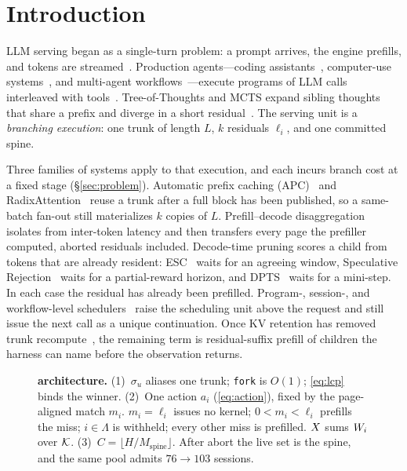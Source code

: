 \section{Introduction}
\label{sec:intro}

LLM serving began as a single-turn problem: a prompt arrives, the engine prefills, and tokens are streamed~\cite{orca,vllm,sglang}.
Production agents---coding assistants~\cite{sweagent,openhands}, computer-use systems~\cite{webarena}, and multi-agent workflows~\cite{autogen,metagpt}---execute programs of LLM calls interleaved with tools~\cite{react,compoundai}.
Tree-of-Thoughts and MCTS expand sibling thoughts that share a prefix and diverge in a short residual~\cite{tot,hive}.
The serving unit is a \emph{branching execution}: one trunk of length $L$, $k$ residuals $\ell_i$, and one committed spine.

Three families of systems apply to that execution, and each incurs branch cost at a fixed stage (\S\ref{sec:problem}).
Automatic prefix caching (APC)~\cite{vllm} and RadixAttention~\cite{sglang} reuse a trunk after a full block has been published, so a same-batch fan-out still materializes $k$ copies of $L$.
Prefill--decode disaggregation~\cite{distserve,splitwise} isolates \ttft{} from inter-token latency and then transfers every page the prefiller computed, aborted residuals included.
Decode-time pruning scores a child from tokens that are already resident: ESC~\cite{esc} waits for an agreeing window, Speculative Rejection~\cite{specrej} waits for a partial-reward horizon, and DPTS~\cite{dpts} waits for a mini-step.
In each case the residual has already been prefilled.
Program-, session-, and workflow-level schedulers~\cite{autellix,thunderagent,continuum,mori,ayo,parrot,pythia} raise the scheduling unit above the request and still issue the next call as a unique continuation.
Once KV retention has removed trunk recompute~\cite{continuum,mori}, the remaining \ttft{} term is residual-suffix prefill of children the harness can name before the observation returns.

\begin{figure}[t]
\centering
\resizebox{\textwidth}{!}{}
\caption{\textbf{\sys{} architecture.}
(1)~$\sigma_u$ aliases one trunk; \texttt{fork} is $O(1)$; \eqref{eq:lcp} binds the winner.
(2)~One action $a_i$ (\eqref{eq:action}), fixed by the page-aligned match $m_i$.
$m_i=\ell_i$ issues no kernel; $0{<}m_i{<}\ell_i$ prefills the miss; $i{\in}\Lambda$ is withheld; every other miss is prefilled.
$X$ sums $W_i$ over $\mathcal{K}$.
(3)~$C=\lfloor H/M_{\mathrm{spine}}\rfloor$.
After abort the live set is the spine, and the same pool admits $76{\to}103$ sessions.}
\label{fig:system}
\end{figure}

